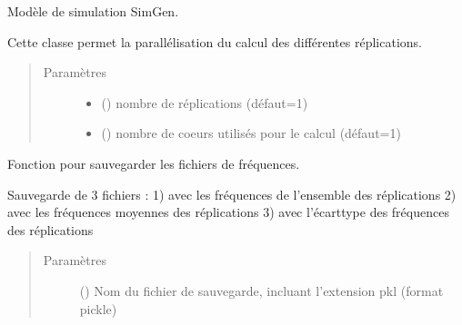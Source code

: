 \documentclass[letterpaper,10pt,french]{sphinxmanual}
\begin{document}
\begin{fulllineitems}
\label{\detokenize{utilisation:id9}}
Modèle de simulation SimGen.

Cette classe permet la parallélisation du calcul des différentes réplications.
\begin{quote}\begin{description}
\item[{Paramètres}] \leavevmode\begin{itemize}
\item {} 
 () \textendash{} nombre de réplications (défaut=1)

\item {} 
 () \textendash{} nombre de coeurs utilisés pour le calcul (défaut=1)

\end{itemize}

\end{description}\end{quote}

\begin{fulllineitems}
\label{\detokenize{utilisation:simgen.replicate.save}}
Fonction pour sauvegarder les fichiers de fréquences.

Sauvegarde de 3 fichiers : 1)  avec les fréquences de l’ensemble des réplications 2)  avec les fréquences moyennes des réplications 3)  avec l’écart\sphinxhyphen{}type des fréquences des réplications
\begin{quote}\begin{description}
\item[{Paramètres}] \leavevmode
{} () \textendash{} Nom du fichier de sauvegarde, incluant l’extension pkl (format pickle)

\end{description}\end{quote}

\end{fulllineitems}


\end{fulllineitems}
\end{document}
